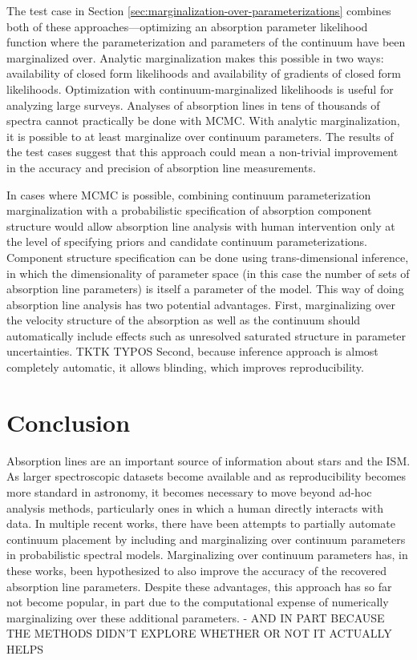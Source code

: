 \documentclass[trackchanges]{aastex62}
\begin{document}
The test case in Section \ref{sec:marginalization-over-parameterizations} combines both of these approaches---optimizing an absorption parameter likelihood function where the parameterization and parameters of the continuum have been marginalized over.
Analytic marginalization makes this possible in two ways: availability of closed form likelihoods and availability of gradients of closed form likelihoods.
Optimization with continuum-marginalized likelihoods is useful for analyzing large surveys.
Analyses of absorption lines in tens of thousands of spectra \citep[e.g.]{2013ApJ...770..130Z,Zasowski:2015hi} cannot practically be done with MCMC.
With analytic marginalization, it is possible to at least marginalize over continuum parameters.
The results of the test cases suggest that this approach could mean a non-trivial improvement in the accuracy and precision of absorption line measurements.

In cases where MCMC is possible, combining continuum parameterization marginalization with a probabilistic specification of absorption component structure would allow absorption line analysis with human intervention only at the level of specifying priors and candidate continuum parameterizations.
Component structure specification can be done using trans-dimensional inference, in which the dimensionality of parameter space (in this case the number of sets of absorption line parameters) is itself a parameter of the model.
This way of doing absorption line analysis has two potential advantages.
First, marginalizing over the velocity structure of the absorption as well as the continuum should automatically include effects such as unresolved saturated structure in parameter uncertainties.
TKTK TYPOS
Second, because inference approach is almost completely automatic, it allows blinding, which improves reproducibility.

\section{Conclusion}
\label{sec:conclusion}
Absorption lines are an important source of information about stars and the ISM.
As larger spectroscopic datasets become available and as reproducibility becomes more standard in astronomy, it becomes necessary to move beyond ad-hoc analysis methods, particularly ones in which a human directly interacts with data.
In multiple recent works, there have been attempts to partially automate continuum placement by including and marginalizing over continuum parameters in probabilistic spectral models.
Marginalizing over continuum parameters has, in these works, been hypothesized to also improve the accuracy of the recovered absorption line parameters.
Despite these advantages, this approach has so far not become popular, in part due to the computational expense of numerically marginalizing over these additional parameters.
- AND IN PART BECAUSE THE METHODS DIDN'T EXPLORE WHETHER OR NOT IT ACTUALLY HELPS
\end{document}

